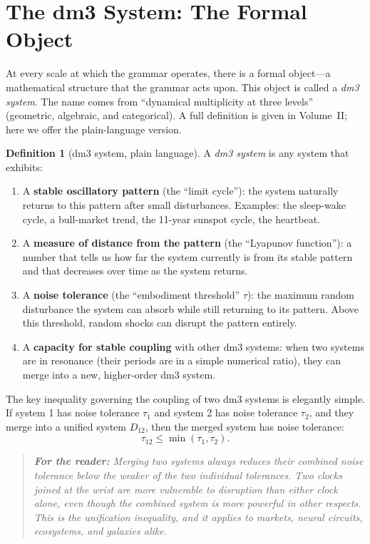 \documentclass[12pt, oneside]{book}
\theoremstyle{plain}
\theoremstyle{definition}
\newtheorem{definition}{Definition}[chapter]
\theoremstyle{remark}
\newenvironment{fortheread}[1]{%
  \begin{quote}\small\itshape\textbf{For the reader:} #1\quad}
  {\end{quote}}
\begin{document}
\section{The dm3 System: The Formal Object}

At every scale at which the grammar operates, there is a formal
object---a mathematical structure that the grammar acts upon.
This object is called a \emph{dm3 system}. The name comes
from ``dynamical multiplicity at three levels'' (geometric,
algebraic, and categorical). A full definition is given in
Volume~II; here we offer the plain-language version.

\begin{definition}[dm3 system, plain language]
A \emph{dm3 system} is any system that exhibits:
\begin{enumerate}[label=(\arabic*)]
  \item A \textbf{stable oscillatory pattern} (the ``limit cycle''):
    the system naturally returns to this pattern after small
    disturbances. Examples: the sleep-wake cycle, a bull-market
    trend, the 11-year sunspot cycle, the heartbeat.
  \item A \textbf{measure of distance from the pattern}
    (the ``Lyapunov function''): a number that tells us how
    far the system currently is from its stable pattern and
    that decreases over time as the system returns.
  \item A \textbf{noise tolerance} (the ``embodiment threshold''
    $\tau$): the maximum random disturbance the system can
    absorb while still returning to its pattern. Above this
    threshold, random shocks can disrupt the pattern entirely.
  \item A \textbf{capacity for stable coupling} with other
    dm3 systems: when two systems are in resonance (their
    periods are in a simple numerical ratio), they can
    merge into a new, higher-order dm3 system.
\end{enumerate}
\end{definition}

The key inequality governing the coupling of two dm3 systems
is elegantly simple. If system 1 has noise tolerance $\tau_1$
and system 2 has noise tolerance $\tau_2$, and they merge into
a unified system $D_{12}$, then the merged system has noise
tolerance:
\begin{equation}
\tau_{12} \leq \min(\tau_1, \tau_2).
\label{eq:unification}
\end{equation}

\begin{fortheread}{Merging two systems always reduces their
combined noise tolerance below the weaker of the two individual
tolerances. Two clocks joined at the wrist are more vulnerable
to disruption than either clock alone, even though the combined
system is more powerful in other respects. This is the
\emph{unification inequality}, and it applies to markets,
neural circuits, ecosystems, and galaxies alike.}
\end{fortheread}
\end{document}
